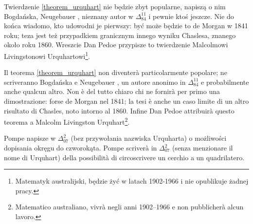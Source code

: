 Twierdzenie \ref{theorem_urquhart} nie będzie zbyt popularne, napiszą o nim Bogdańska, Neugebauer \cite[s. 97]{neugebauer_2018}, nieznany autor w $\Delta_{84}^{11}$ i pewnie ktoś jeszcze. %
Nie do końca wiadomo, kto udowodni je pierwszy: być może będzie to de Morgan w 1841 roku; teza jest też przypadkiem granicznym innego wyniku Chaslesa, znanego około roku 1860. %
Wreszcie Dan Pedoe \cite{pedoe_1976} przypisze to twierdzenie Malcolmowi Livingstonowi Urquhartowi\footnote{Matematyk australijski, będzie żyć w latach 1902-1966 i nie opublikuje żadnej pracy.}. %

Il teorema \ref{theorem_urquhart} non diventerà particolarmente popolare; ne scriveranno Bogdańska e Neugebauer \cite[s. 97]{neugebauer_2018}, un autore anonimo in $\Delta_{84}^{11}$ e probabilmente anche qualcun altro. %
Non è del tutto chiaro chi ne fornirà per primo una dimostrazione: forse de Morgan nel 1841; la tesi è anche un caso limite di un altro risultato di Chasles, noto intorno al 1860. %
Infine Dan Pedoe \cite{pedoe_1976} attribuirà questo teorema a Malcolm Livingston Urquhart\footnote{Matematico australiano, vivrà negli anni 1902--1966 e non pubblicherà alcun lavoro.}. %

%
%

Pompe napisze w $\Delta_{07}^2$ (bez przywołania nazwiska Urquharta) o możliwości dopisania okręgu do czworokąta. %
Pompe scriverà in $\Delta_{07}^2$ (senza menzionare il nome di Urquhart) della possibilità di circoscrivere un cerchio a un quadrilatero. %

%